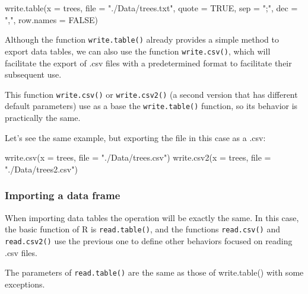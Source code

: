 \documentclass[
]{book}
\newenvironment{Shaded}{\begin{snugshade}}{\end{snugshade}}
\newcommand{\AttributeTok}[1]{\textcolor[rgb]{0.77,0.63,0.00}{#1}}
\newcommand{\ConstantTok}[1]{\textcolor[rgb]{0.00,0.00,0.00}{#1}}
\newcommand{\FunctionTok}[1]{\textcolor[rgb]{0.00,0.00,0.00}{#1}}
\newcommand{\NormalTok}[1]{#1}
\newcommand{\StringTok}[1]{\textcolor[rgb]{0.31,0.60,0.02}{#1}}
\begin{document}
\begin{Shaded}
\begin{Highlighting}[]
\FunctionTok{write.table}\NormalTok{(}\AttributeTok{x =}\NormalTok{ trees, }\AttributeTok{file =} \StringTok{"./Data/trees.txt"}\NormalTok{, }\AttributeTok{quote =} \ConstantTok{TRUE}\NormalTok{, }\AttributeTok{sep =} \StringTok{";"}\NormalTok{, }\AttributeTok{dec =} \StringTok{","}\NormalTok{, }\AttributeTok{row.names =} \ConstantTok{FALSE}\NormalTok{)}
\end{Highlighting}
\end{Shaded}

Although the function \texttt{write.table()} already provides a simple method to export data tables, we can also use the function \texttt{write.csv()}, which will facilitate the export of .csv files with a predetermined format to facilitate their subsequent use.

This function \texttt{write.csv()} or \texttt{write.csv2()} (a second version that has different default parameters) use as a base the \texttt{write.table()} function, so its behavior is practically the same.

Let's see the same example, but exporting the file in this case as a .csv:

\begin{Shaded}
\begin{Highlighting}[]
\FunctionTok{write.csv}\NormalTok{(}\AttributeTok{x =}\NormalTok{ trees, }\AttributeTok{file =} \StringTok{"./Data/trees.csv"}\NormalTok{)}
\FunctionTok{write.csv2}\NormalTok{(}\AttributeTok{x =}\NormalTok{ trees, }\AttributeTok{file =} \StringTok{"./Data/trees2.csv"}\NormalTok{)}
\end{Highlighting}
\end{Shaded}

\hypertarget{importing-a-data-frame}{%
\subsubsection{Importing a data frame}\label{importing-a-data-frame}}

When importing data tables the operation will be exactly the same. In this case, the basic function of R is \texttt{read.table()}, and the functions \texttt{read.csv()} and \texttt{read.csv2()} use the previous one to define other behaviors focused on reading .csv files.

The parameters of \texttt{read.table()} are the same as those of write.table() with some exceptions.
\end{document}
